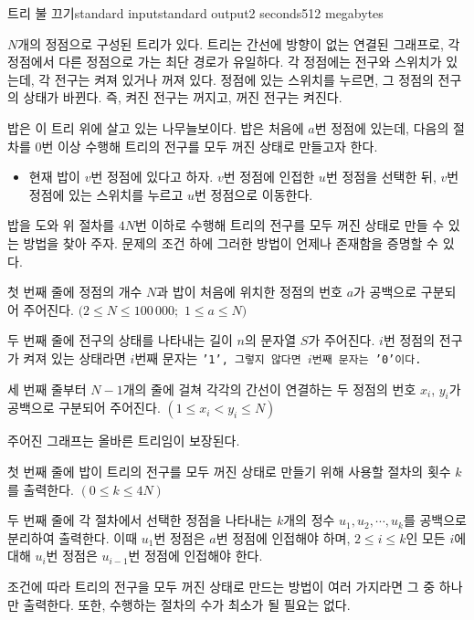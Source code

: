 \begin{problem}{트리 불 끄기}{standard input}{standard output}{2 seconds}{512 megabytes}

$N$개의 정점으로 구성된 트리가 있다. 트리는 간선에 방향이 없는 연결된 그래프로, 각 정점에서 다른 정점으로 가는 최단 경로가 유일하다. 각 정점에는 전구와 스위치가 있는데, 각 전구는 켜져 있거나 꺼져 있다. 정점에 있는 스위치를 누르면, 그 정점의 전구의 상태가 바뀐다. 즉, 켜진 전구는 꺼지고, 꺼진 전구는 켜진다.

밥은 이 트리 위에 살고 있는 나무늘보이다. 밥은 처음에 $a$번 정점에 있는데, 다음의 절차를 $0$번 이상 수행해 트리의 전구를 모두 꺼진 상태로 만들고자 한다.

\begin{itemize}
  \item 현재 밥이 $v$번 정점에 있다고 하자. $v$번 정점에 인접한 $u$번 정점을 선택한 뒤, $v$번 정점에 있는 스위치를 누르고 $u$번 정점으로 이동한다.
\end{itemize}

밥을 도와 위 절차를 $4N$번 이하로 수행해 트리의 전구를 모두 꺼진 상태로 만들 수 있는 방법을 찾아 주자. 문제의 조건 하에 그러한 방법이 언제나 존재함을 증명할 수 있다.

\InputFile
첫 번째 줄에 정점의 개수 $N$과 밥이 처음에 위치한 정점의 번호 $a$가 공백으로 구분되어 주어진다. $(2 \le N \le 100\,000;$ $1 \le a \le N)$

두 번째 줄에 전구의 상태를 나타내는 길이 $n$의 문자열 $S$가 주어진다. $i$번 정점의 전구가 켜져 있는 상태라면 $i$번째 문자는 \tt{'1'}, 그렇지 않다면 $i$번째 문자는 \tt{'0'}이다.

세 번째 줄부터 $N-1$개의 줄에 걸쳐 각각의 간선이 연결하는 두 정점의 번호 $x_i$, $y_i$가 공백으로 구분되어 주어진다. $(1 \le x_i < y_i \le N)$

주어진 그래프는 올바른 트리임이 보장된다.

\OutputFile
첫 번째 줄에 밥이 트리의 전구를 모두 꺼진 상태로 만들기 위해 사용할 절차의 횟수 $k$를 출력한다. $(0 \le k \le 4N)$

두 번째 줄에 각 절차에서 선택한 정점을 나타내는 $k$개의 정수 $u_1,u_2,\cdots,u_k$를 공백으로 분리하여 출력한다. 이때 $u_1$번 정점은 $a$번 정점에 인접해야 하며, $2 \le i \le k$인 모든 $i$에 대해 $u_i$번 정점은 $u_{i-1}$번 정점에 인접해야 한다.

조건에 따라 트리의 전구을 모두 꺼진 상태로 만드는 방법이 여러 가지라면 그 중 하나만 출력한다. 또한, 수행하는 절차의 수가 최소가 될 필요는 없다.

\Example


\end{problem}
